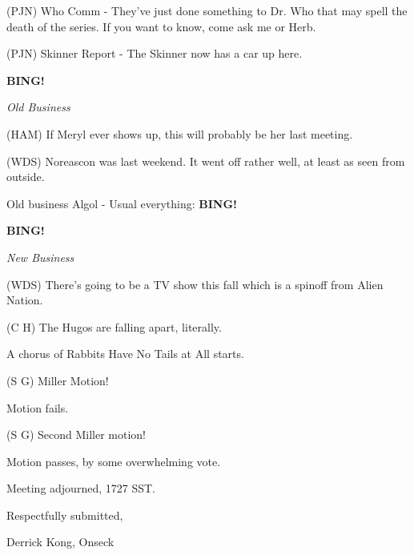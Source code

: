 \documentclass[12pt]{article}
\newcommand{\bing}{{\bf BING!} }
\newcommand{\goto}[1]{\bing \vskip 12pt \centerline{{\em{#1}}}}
\begin{document}
(PJN) Who Comm - They've just done something to Dr. Who that may spell the death of the series. If you want to know, come ask me or Herb.

(PJN) Skinner Report - The Skinner now has a car up here.

\goto{Old Business}

(HAM) If Meryl ever shows up, this will probably be her last meeting.

(WDS) Noreascon was last weekend. It went off rather well, at least as seen from outside.

Old business Algol - Usual everything: \bing

\goto{New Business}

(WDS) There's going to be a TV show this fall which is a spinoff from Alien Nation.

(C H) The Hugos are falling apart, literally.

A chorus of Rabbits Have No Tails at All starts.

(S G) Miller Motion!

Motion fails.

(S G) Second Miller motion!

Motion passes, by some overwhelming vote.

\vspace{12pt}

\noindent
Meeting adjourned, 1727 SST.

\vspace{18pt}

\centerline{Respectfully submitted,}
\centerline{Derrick Kong, Onseck}
\end{document}
